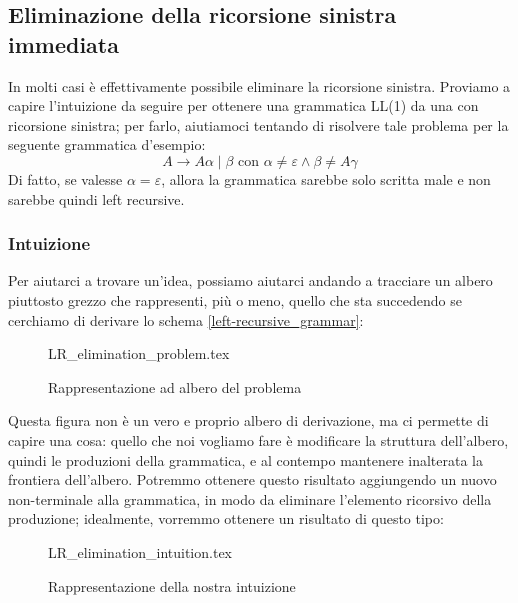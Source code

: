 \documentclass[class=book, crop=false, oneside, 12pt]{standalone}
\begin{document}
\subsection{Eliminazione della ricorsione sinistra immediata}
In molti casi è effettivamente possibile eliminare la ricorsione sinistra. 
Proviamo a capire l'intuizione da seguire per ottenere una grammatica LL(1) da una con ricorsione sinistra; per farlo, aiutiamoci tentando di risolvere tale problema per la seguente grammatica d'esempio:
\begin{equation}
    \label{left-recursive_grammar}
    A \to A \alpha \mid \beta \textrm{  con  } \alpha \neq \varepsilon \land \beta \neq A \gamma
\end{equation}
Di fatto, se valesse \(\alpha = \varepsilon\), allora la grammatica sarebbe solo scritta male e non sarebbe quindi left recursive.

\subsubsection{Intuizione}
Per aiutarci a trovare un'idea, possiamo aiutarci andando a tracciare un albero piuttosto grezzo che rappresenti, più o meno, quello che sta succedendo se cerchiamo di derivare lo schema \ref{left-recursive_grammar}:
\begin{figure}[H]
    \centering
    {LR_elimination_problem.tex}
    \caption{Rappresentazione ad albero del problema}
    \label{lrremove-intuition_1}
\end{figure}
Questa figura non è un vero e proprio albero di derivazione, ma ci permette di capire una cosa: quello che noi vogliamo fare è modificare la struttura dell'albero, quindi le produzioni della grammatica, e al contempo mantenere inalterata la frontiera dell'albero. Potremmo ottenere questo risultato aggiungendo un nuovo non-terminale alla grammatica, in modo da eliminare l'elemento ricorsivo della produzione; idealmente, vorremmo ottenere un risultato di questo tipo:
\begin{figure}[H]
    \centering
    {LR_elimination_intuition.tex}
    \caption{Rappresentazione della nostra intuizione}
    \label{lrremove-intuition_2}
\end{figure}
\end{document}
